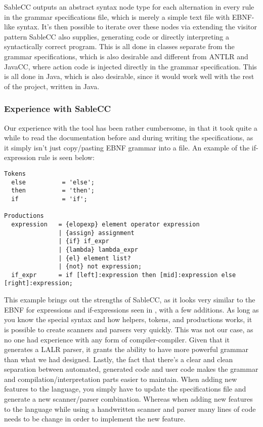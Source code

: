 SableCC outputs an abstract syntax node type for each alternation
in every rule in the grammar specifications file, which is merely a
simple text file with EBNF-like syntax. It's then possible to iterate
over these nodes via extending the visitor pattern SableCC also
supplies, generating code or directly interpreting a syntactically
correct program. This is all done in classes separate from the grammar
specifications, which is also desirable and different from ANTLR
and JavaCC, where action code is injected directly in the grammar
specification. This is all done in Java, which is also desirable, since
it would work well with the rest of the project, written in Java.

\subsubsection{Experience with SableCC}
Our experience with the tool has been rather cumbersome, in that it took
quite a while to read the documentation before and during writing the
specifications, as it simply isn't just copy/pasting EBNF grammar
into a file. An example of the if-expression rule is seen below:

\begin{lstlisting}[caption={Part of the grammar specifications file of SableCC, with focus on if-expressions.}]
Tokens
  else          = 'else';
  then          = 'then';
  if            = 'if';

Productions
  expression   = {elopexp} element operator expression
               | {assign} assignment
               | {if} if_expr
               | {lambda} lambda_expr
               | {el} element list?
               | {not} not expression;
  if_expr      = if [left]:expression then [mid]:expression else [right]:expression;
\end{lstlisting}

This example brings out the strengths of SableCC, as it looks very
similar to the EBNF for expressions and if-expressions seen in
, with a few additions. As long as you know
the special syntax and how helpers, tokens, and productions works, it
is possible to create scanners and parsers very quickly. This was not
our case, as no one had experience with any form of compiler-compiler.
Given that it generates a LALR parser, it grants the ability to have
more powerful grammar than what we had designed. Lastly, the fact that
there's a clear and clean separation between automated, generated code
and user code makes the grammar and compilation/interpretation parts
easier to maintain. When adding new features to the language, you simply
have to update the specifications file and generate a new scanner/parser
combination. Whereas when adding new features to the language
while using a handwritten scanner and parser many lines of code needs
to be change in order to implement the new feature.

